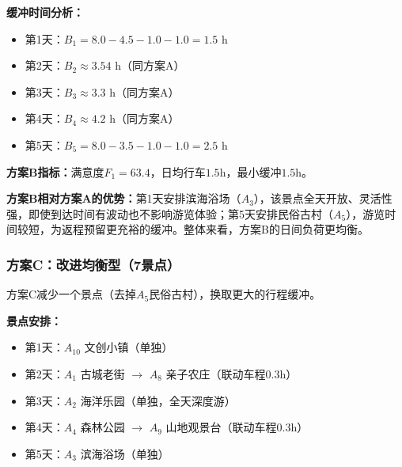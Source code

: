 \documentclass[12pt,a4paper]{ctexart}
\begin{document}
\textbf{缓冲时间分析：}
\begin{itemize}
    \item 第1天：$B_1 = 8.0 - 4.5 - 1.0 - 1.0 = 1.5$ h
    \item 第2天：$B_2 \approx 3.54$ h（同方案A）
    \item 第3天：$B_3 \approx 3.3$ h（同方案A）
    \item 第4天：$B_4 \approx 4.2$ h（同方案A）
    \item 第5天：$B_5 = 8.0 - 3.5 - 1.0 - 1.0 = 2.5$ h
\end{itemize}

\textbf{方案B指标：}满意度$F_1 = 63.4$，日均行车$1.5$h，最小缓冲$1.5$h。

\textbf{方案B相对方案A的优势：}第1天安排滨海浴场（$A_3$），该景点全天开放、灵活性强，即使到达时间有波动也不影响游览体验；第5天安排民俗古村（$A_5$），游览时间较短，为返程预留更充裕的缓冲。整体来看，方案B的日间负荷更均衡。

\subsubsection{方案C：改进均衡型（7景点）}

方案C减少一个景点（去掉$A_5$民俗古村），换取更大的行程缓冲。

\textbf{景点安排：}
\begin{itemize}
    \item 第1天：$A_{10}$ 文创小镇（单独）
    \item 第2天：$A_1$ 古城老街 $\to$ $A_8$ 亲子农庄（联动车程0.3h）
    \item 第3天：$A_2$ 海洋乐园（单独，全天深度游）
    \item 第4天：$A_4$ 森林公园 $\to$ $A_9$ 山地观景台（联动车程0.3h）
    \item 第5天：$A_3$ 滨海浴场（单独）
\end{itemize}
\end{document}
